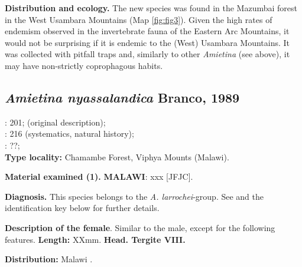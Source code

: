 \documentclass[fleqn,10pt,lineno]{wlpeerj}
\begin{document}
\textbf{Distribution and ecology.} The new species was found in the Mazumbai forest in the West Usambara Mountains (Map \ref{fig:fig3}). Given the high rates of endemism observed in the invertebrate fauna of the Eastern Arc Mountains, it would not be surprising if it is endemic to the (West) Usambara Mountains. It was collected with pitfall traps and, similarly to other \textit{Amietina} (see above), it may have non-strictly coprophagous habits.


\subsection*{\textbf{\textit{Amietina nyassalandica} Branco, 1989}\\}

\cite{branco1988deux}: 201; (original description);\\
\cite{davis2008african}: 216 (systematics, natural history);\\
\cite{josso2008unidentis}: ??;\\

\tab\textbf{Type locality:} Chamambe Forest, Viphya Mounts (Malawi).

\textbf{Material examined (1\female).} \textbf{MALAWI}: xxx [JFJC].

\textbf{Diagnosis.} This species belongs to the \textit{A. larrochei}-group. See \citep{branco1988deux} and the identification key below for further details.

\textbf{Description of the female}. Similar to the male, except for the following features. \textbf{Length:} XXmm. \textbf{Head. Tergite VIII. }

\textbf{Distribution:} Malawi \citep{branco1988deux}.
\end{document}
